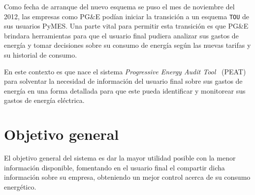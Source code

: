 Como fecha de arranque del nuevo esquema se puso el mes de noviembre del 2012,
las empresas como PG\&E podían iniciar la transición a un esquema \texttt{TOU}
de sus usuarios PyMES. Una parte vital para permitir esta transición es que
PG\&E brindara herramientas para que el usuario final pudiera analizar sus
gastos de energía y tomar decisiones sobre su consumo de energía según las
nuevas tarifas y su historial de consumo.

En este contexto es que nace el sistema \textit{Progressive
  Energy Audit Tool} \ (PEAT) para solventar la necesidad de información
del usuario final sobre sus gastos de energía en una forma detallada para
que este pueda identificar y monitorear sus gastos de energía eléctrica.

\section{Objetivo general}

El objetivo general del sistema es dar la mayor utilidad posible con la menor
información disponible, fomentando en el usuario final el compartir dicha
información sobre su empresa, obteniendo un mejor control
acerca de su consumo energético.
